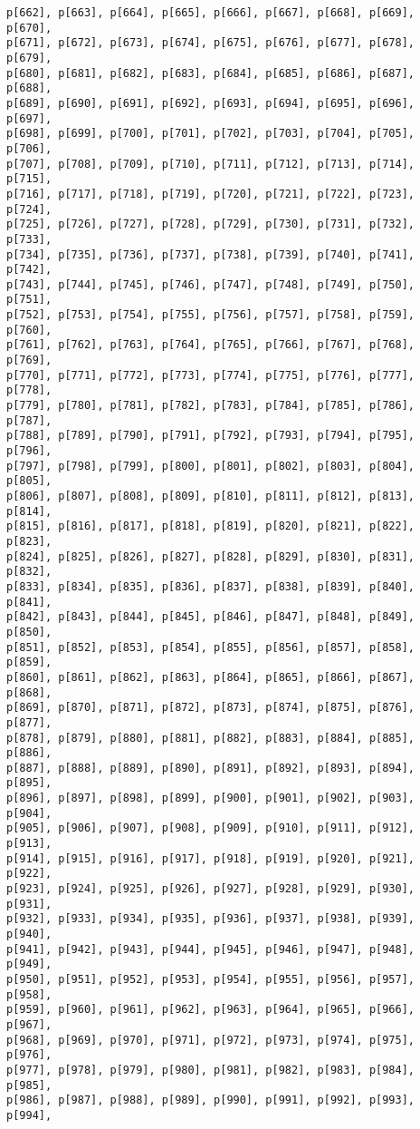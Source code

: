 \documentclass[
  letterpaper,
  DIV=11,
  numbers=noendperiod]{scrartcl}
\begin{document}
\begin{verbatim}
p[662], p[663], p[664], p[665], p[666], p[667], p[668], p[669], p[670],
p[671], p[672], p[673], p[674], p[675], p[676], p[677], p[678], p[679],
p[680], p[681], p[682], p[683], p[684], p[685], p[686], p[687], p[688],
p[689], p[690], p[691], p[692], p[693], p[694], p[695], p[696], p[697],
p[698], p[699], p[700], p[701], p[702], p[703], p[704], p[705], p[706],
p[707], p[708], p[709], p[710], p[711], p[712], p[713], p[714], p[715],
p[716], p[717], p[718], p[719], p[720], p[721], p[722], p[723], p[724],
p[725], p[726], p[727], p[728], p[729], p[730], p[731], p[732], p[733],
p[734], p[735], p[736], p[737], p[738], p[739], p[740], p[741], p[742],
p[743], p[744], p[745], p[746], p[747], p[748], p[749], p[750], p[751],
p[752], p[753], p[754], p[755], p[756], p[757], p[758], p[759], p[760],
p[761], p[762], p[763], p[764], p[765], p[766], p[767], p[768], p[769],
p[770], p[771], p[772], p[773], p[774], p[775], p[776], p[777], p[778],
p[779], p[780], p[781], p[782], p[783], p[784], p[785], p[786], p[787],
p[788], p[789], p[790], p[791], p[792], p[793], p[794], p[795], p[796],
p[797], p[798], p[799], p[800], p[801], p[802], p[803], p[804], p[805],
p[806], p[807], p[808], p[809], p[810], p[811], p[812], p[813], p[814],
p[815], p[816], p[817], p[818], p[819], p[820], p[821], p[822], p[823],
p[824], p[825], p[826], p[827], p[828], p[829], p[830], p[831], p[832],
p[833], p[834], p[835], p[836], p[837], p[838], p[839], p[840], p[841],
p[842], p[843], p[844], p[845], p[846], p[847], p[848], p[849], p[850],
p[851], p[852], p[853], p[854], p[855], p[856], p[857], p[858], p[859],
p[860], p[861], p[862], p[863], p[864], p[865], p[866], p[867], p[868],
p[869], p[870], p[871], p[872], p[873], p[874], p[875], p[876], p[877],
p[878], p[879], p[880], p[881], p[882], p[883], p[884], p[885], p[886],
p[887], p[888], p[889], p[890], p[891], p[892], p[893], p[894], p[895],
p[896], p[897], p[898], p[899], p[900], p[901], p[902], p[903], p[904],
p[905], p[906], p[907], p[908], p[909], p[910], p[911], p[912], p[913],
p[914], p[915], p[916], p[917], p[918], p[919], p[920], p[921], p[922],
p[923], p[924], p[925], p[926], p[927], p[928], p[929], p[930], p[931],
p[932], p[933], p[934], p[935], p[936], p[937], p[938], p[939], p[940],
p[941], p[942], p[943], p[944], p[945], p[946], p[947], p[948], p[949],
p[950], p[951], p[952], p[953], p[954], p[955], p[956], p[957], p[958],
p[959], p[960], p[961], p[962], p[963], p[964], p[965], p[966], p[967],
p[968], p[969], p[970], p[971], p[972], p[973], p[974], p[975], p[976],
p[977], p[978], p[979], p[980], p[981], p[982], p[983], p[984], p[985],
p[986], p[987], p[988], p[989], p[990], p[991], p[992], p[993], p[994],

\end{verbatim}
\end{document}
